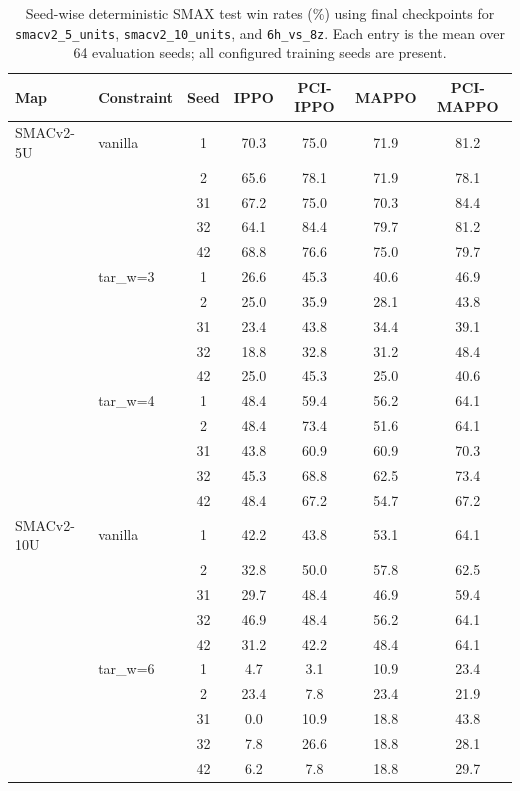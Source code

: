 \begin{table}[t]
\centering
\small
\setlength{\tabcolsep}{4pt}
\caption{Seed-wise deterministic SMAX test win rates (\%) using final checkpoints for \texttt{smacv2\_5\_units}, \texttt{smacv2\_10\_units}, and \texttt{6h\_vs\_8z}. Each entry is the mean over 64 evaluation seeds; all configured training seeds are present.}
\label{tab:smax_seedwise_part2}
\begin{tabular}{llccccc}
\toprule
Map & Constraint & Seed & IPPO & PCI-IPPO & MAPPO & PCI-MAPPO \\
\midrule
SMACv2-5U & vanilla & 1 & 70.3 & 75.0 & 71.9 & 81.2 \\
 &  & 2 & 65.6 & 78.1 & 71.9 & 78.1 \\
 &  & 31 & 67.2 & 75.0 & 70.3 & 84.4 \\
 &  & 32 & 64.1 & 84.4 & 79.7 & 81.2 \\
 &  & 42 & 68.8 & 76.6 & 75.0 & 79.7 \\
 & tar_w=3 & 1 & 26.6 & 45.3 & 40.6 & 46.9 \\
 &  & 2 & 25.0 & 35.9 & 28.1 & 43.8 \\
 &  & 31 & 23.4 & 43.8 & 34.4 & 39.1 \\
 &  & 32 & 18.8 & 32.8 & 31.2 & 48.4 \\
 &  & 42 & 25.0 & 45.3 & 25.0 & 40.6 \\
 & tar_w=4 & 1 & 48.4 & 59.4 & 56.2 & 64.1 \\
 &  & 2 & 48.4 & 73.4 & 51.6 & 64.1 \\
 &  & 31 & 43.8 & 60.9 & 60.9 & 70.3 \\
 &  & 32 & 45.3 & 68.8 & 62.5 & 73.4 \\
 &  & 42 & 48.4 & 67.2 & 54.7 & 67.2 \\
\midrule
SMACv2-10U & vanilla & 1 & 42.2 & 43.8 & 53.1 & 64.1 \\
 &  & 2 & 32.8 & 50.0 & 57.8 & 62.5 \\
 &  & 31 & 29.7 & 48.4 & 46.9 & 59.4 \\
 &  & 32 & 46.9 & 48.4 & 56.2 & 64.1 \\
 &  & 42 & 31.2 & 42.2 & 48.4 & 64.1 \\
 & tar_w=6 & 1 & 4.7 & 3.1 & 10.9 & 23.4 \\
 &  & 2 & 23.4 & 7.8 & 23.4 & 21.9 \\
 &  & 31 & 0.0 & 10.9 & 18.8 & 43.8 \\
 &  & 32 & 7.8 & 26.6 & 18.8 & 28.1 \\
 &  & 42 & 6.2 & 7.8 & 18.8 & 29.7 \\

\end{tabular}
\end{table}
